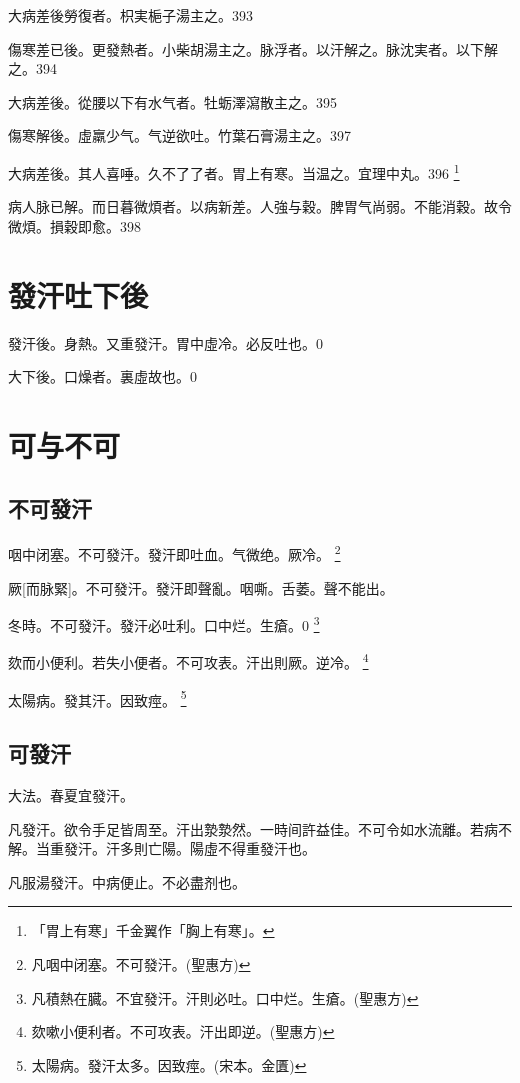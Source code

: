 \documentclass[11pt,oneside,b5paper]{ctexbook}
\begin{document}
\begin{flushleft}
大病差後勞復者。枳実梔子湯主之。393

傷寒差已後。更發熱者。小柴胡湯主之。脉浮者。以汗解之。脉沈実者。以下解之。394

大病差後。從腰以下有水气者。牡蛎澤瀉散主之。395

傷寒解後。虛羸少气。气逆欲吐。竹葉石膏湯主之。397

大病差後。其人喜唾。久不了了者。胃上有寒。当温之。宜理中丸。396
\footnote{「胃上有寒」千金翼作「胸上有寒」。}

病人脉已解。而日暮微煩者。以病新差。人強与穀。脾胃气尚弱。不能消穀。故令微煩。損穀即愈。398

\chapter{發汗吐下後}

發汗後。身熱。又重發汗。胃中虛冷。必反吐也。0

大下後。口燥者。裏虛故也。0

\chapter{可与不可}

\section{不可發汗}

咽中闭塞。不可發汗。發汗即吐血。气微绝。厥冷。
\footnote{凡咽中闭塞。不可發汗。(聖惠方)}

厥[而脉緊]。不可發汗。發汗即聲亂。咽嘶。舌萎。聲不能出。

冬時。不可發汗。發汗必吐利。口中烂。生瘡。0
\footnote{凡積熱在臓。不宜發汗。汗則必吐。口中烂。生瘡。(聖惠方)}

欬而小便利。若失小便者。不可攻表。汗出則厥。逆冷。
\footnote{欬嗽小便利者。不可攻表。汗出即逆。(聖惠方)}

太陽病。發其汗。因致痙。
\footnote{太陽病。發汗太多。因致痙。(宋本。金匱)}

\section{可發汗}

大法。春夏宜發汗。

凡發汗。欲令手足皆周至。汗出漐漐然。一時间許益佳。不可令如水流離。若病不解。当重發汗。汗多則亡陽。陽虛不得重發汗也。

凡服湯發汗。中病便止。不必盡剂也。


\end{flushleft}
\end{document}
